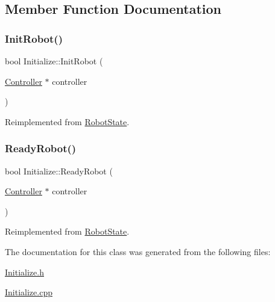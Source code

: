 \subsection{Member Function Documentation}
\mbox{\label{class_initialize_afaeae9e331da4559ae27c7c1f22d92df}} 
\subsubsection{\texorpdfstring{InitRobot()}{InitRobot()}}
{\footnotesize\ttfamily bool Initialize\+::\+Init\+Robot (\begin{DoxyParamCaption}\item[{\mbox{\hyperlink{class_controller}{Controller}} $\ast$}]{controller }\end{DoxyParamCaption})\hspace{0.3cm}{\ttfamily [virtual]}}



Reimplemented from \mbox{\hyperlink{class_robot_state_a5087ea1ba96b9aad623fe52bbb249b41}{Robot\+State}}.

\mbox{\label{class_initialize_ab6682470e76cf6ff4b3e75707096dac9}} 
\subsubsection{\texorpdfstring{ReadyRobot()}{ReadyRobot()}}
{\footnotesize\ttfamily bool Initialize\+::\+Ready\+Robot (\begin{DoxyParamCaption}\item[{\mbox{\hyperlink{class_controller}{Controller}} $\ast$}]{controller }\end{DoxyParamCaption})\hspace{0.3cm}{\ttfamily [virtual]}}



Reimplemented from \mbox{\hyperlink{class_robot_state_a1e8e2842a62f2666b3c687ec090a3b4f}{Robot\+State}}.



The documentation for this class was generated from the following files\+:\begin{DoxyCompactItemize}
\item 
\mbox{\hyperlink{_initialize_8h}{Initialize.\+h}}\item 
\mbox{\hyperlink{_initialize_8cpp}{Initialize.\+cpp}}\end{DoxyCompactItemize}
